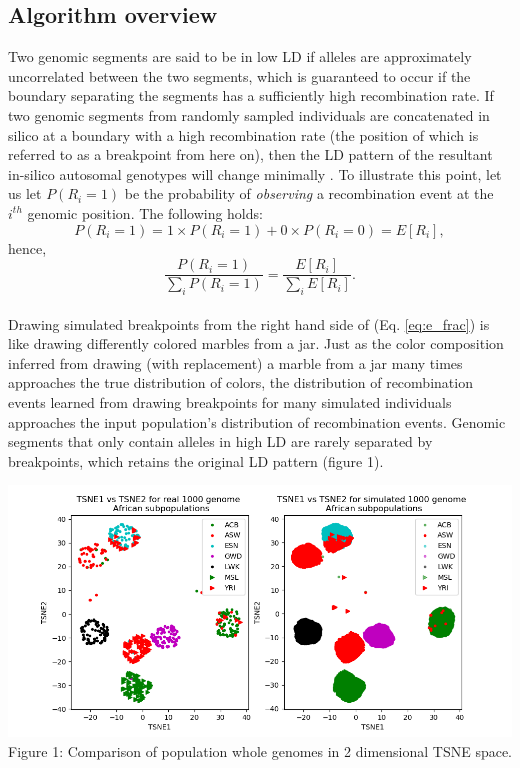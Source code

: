 \documentclass[11pt]{article}
\begin{document}
\begin{singlespace}
\section{Algorithm overview}
Two genomic segments are said to be in low LD if alleles are approximately uncorrelated between the two segments, which is guaranteed to occur if the boundary separating the segments has a sufficiently high recombination rate.
If two genomic segments from randomly sampled individuals are concatenated in silico at a boundary with a high recombination rate (the position of which is referred to as a breakpoint from here on), then the LD pattern of the resultant in-silico autosomal genotypes will change minimally \cite{source:1}.
To illustrate this point, let us let $P(R_i = 1)$ be the probability of \emph{observing} a recombination event at the $i^{th}$ genomic position. The following holds:
\begin{equation}\label{eq:e_ri}
P(R_i = 1) = 1 \times P(R_i = 1) + 0 \times P(R_i = 0) = E[R_i],
\end{equation}
hence,
\begin{equation}\label{eq:e_frac} 
\frac{P(R_i = 1)}{\sum_{i} P(R_i = 1)} = \frac{E[R_i]}{\sum_{i} E[R_i]}.
\end{equation}\\
Drawing simulated breakpoints from the right hand side of (Eq. \ref{eq:e_frac}) is like drawing differently colored marbles from a jar. Just as the color composition inferred from drawing (with replacement) a marble from a jar many times approaches the true distribution of colors, the distribution of recombination events learned from drawing breakpoints for many simulated individuals approaches the input population's distribution of recombination events. Genomic segments that only contain alleles in high LD are rarely separated by breakpoints, which retains the original LD pattern (figure 1).\\

\begin{center}
\noindent \includegraphics[scale = 0.65]{tsne.png}\\
\noindent Figure 1: Comparison of population whole genomes in 2 dimensional TSNE space.\\
\end{center}


\end{singlespace}
\end{document}
